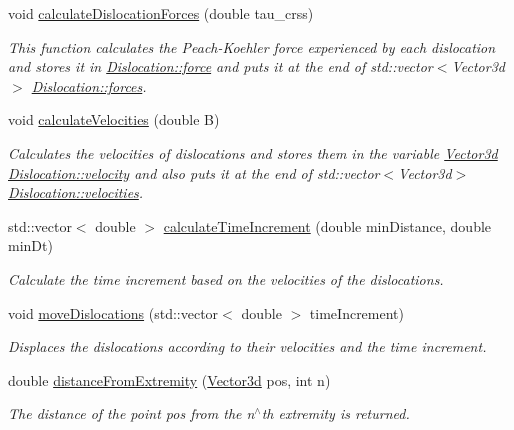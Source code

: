 \begin{DoxyCompactItemize}
void \hyperlink{classSlipPlane_ac16d1abbbc3b938b6f1f29a33a70212d}{calculate\-Dislocation\-Forces} (double tau\-\_\-crss)
\begin{DoxyCompactList}\small\item\em \-This function calculates the \-Peach-\/\-Koehler force experienced by each dislocation and stores it in \hyperlink{classDislocation_a9c19c7493d896bd845c489e1ec3cbbb6}{\-Dislocation\-::force} and puts it at the end of std\-::vector$<$\-Vector3d$>$ \hyperlink{classDislocation_aa8f4567bbfc6a58aaad01d5c423658c1}{\-Dislocation\-::forces}. \end{DoxyCompactList}\item 
void \hyperlink{classSlipPlane_aff7af69ba5235da6c8b142193509683c}{calculate\-Velocities} (double \-B)
\begin{DoxyCompactList}\small\item\em \-Calculates the velocities of dislocations and stores them in the variable \hyperlink{classVector3d}{\-Vector3d} \hyperlink{classDislocation_ad6f4e8e94b2525c2e58a77b9d2916c0e}{\-Dislocation\-::velocity} and also puts it at the end of std\-::vector$<$\-Vector3d$>$ \hyperlink{classDislocation_a9ccdef63384a8b965e70f13920a852f8}{\-Dislocation\-::velocities}. \end{DoxyCompactList}\item 
std\-::vector$<$ double $>$ \hyperlink{classSlipPlane_a255d67230132cf1c7bf18f61098a8b4f}{calculate\-Time\-Increment} (double min\-Distance, double min\-Dt)
\begin{DoxyCompactList}\small\item\em \-Calculate the time increment based on the velocities of the dislocations. \end{DoxyCompactList}\item 
void \hyperlink{classSlipPlane_a88bc78651af7a440ab41c3d28baea5c0}{move\-Dislocations} (std\-::vector$<$ double $>$ time\-Increment)
\begin{DoxyCompactList}\small\item\em \-Displaces the dislocations according to their velocities and the time increment. \end{DoxyCompactList}\item 
double \hyperlink{classSlipPlane_a3523030cccb520b5253a811d062f3ddf}{distance\-From\-Extremity} (\hyperlink{classVector3d}{\-Vector3d} pos, int n)
\begin{DoxyCompactList}\small\item\em \-The distance of the point pos from the n$^\wedge$th extremity is returned. \end{DoxyCompactList}\item 

\end{DoxyCompactItemize}

